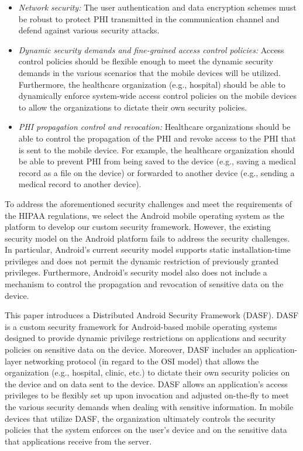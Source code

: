 \begin{itemize}
\item \textit{Network security:} The user authentication and data encryption
schemes must be robust to protect PHI transmitted in the communication channel
and defend against various security attacks.
\item \textit{Dynamic security demands and fine-grained access control policies:}
Access control policies should be flexible
enough to meet the dynamic security demands in the
various scenarios that the mobile devices will be utilized.
Furthermore, the healthcare organization (e.g., hospital)
should be able to dynamically enforce system-wide access
control policies on the mobile devices to allow the
organizations to dictate their own security policies.
\item \textit{PHI propagation control and revocation:} Healthcare organizations
should be able to control the propagation of
the PHI and revoke access to the PHI that is sent to the
mobile device. For example, the healthcare organization
should be able to prevent PHI from being saved to the
device (e.g., saving a medical record as a file on the
device) or forwarded to another device (e.g., sending a
medical record to another device).
\end{itemize}

To address the aforementioned security challenges and meet
the requirements of the HIPAA regulations, we select the
Android mobile operating system as the platform to develop
our custom security framework. However, the existing security
model on the Android platform fails to address the security
challenges. In particular, Android’s current security model
supports static installation-time privileges and does not permit
the dynamic restriction of previously granted privileges.
Furthermore, Android’s security model also does not include
a mechanism to control the propagation and revocation of
sensitive data on the device.

This paper introduces a Distributed Android Security Framework
(DASF). DASF is a custom security framework for
Android-based mobile operating systems designed to provide
dynamic privilege restrictions on applications and security
policies on sensitive data on the device. Moreover, DASF
includes an application-layer networking
protocol (in regard to the OSI model) that allows the organization
(e.g., hospital, clinic, etc.) to dictate their own security
policies on the device and on data sent to the device. DASF
allows an application’s access privileges
to be flexibly set up upon invocation and adjusted on-the-fly to
meet the various security demands when dealing with sensitive
information. In mobile devices that utilize DASF, the organization
ultimately controls the security policies that the system enforces
on the user’s device and on the sensitive data that applications
receive from the server.

